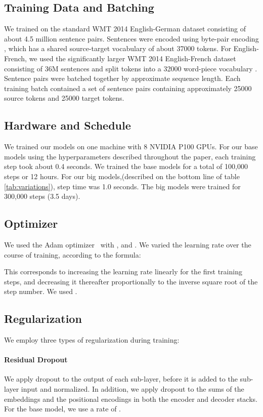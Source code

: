 \documentclass{article}
\begin{document}
\subsection{Training Data and Batching}
We trained on the standard WMT 2014 English-German dataset consisting of about 4.5 million sentence pairs.  Sentences were encoded using byte-pair encoding \citep{DBLP:journals/corr/BritzGLL17}, which has a shared source-target vocabulary of about 37000 tokens. For English-French, we used the significantly larger WMT 2014 English-French dataset consisting of 36M sentences and split tokens into a 32000 word-piece vocabulary \citep{wu2016google}.  Sentence pairs were batched together by approximate sequence length.  Each training batch contained a set of sentence pairs containing approximately 25000 source tokens and 25000 target tokens.  

\subsection{Hardware and Schedule}

We trained our models on one machine with 8 NVIDIA P100 GPUs.  For our base models using the hyperparameters described throughout the paper, each training step took about 0.4 seconds.  We trained the base models for a total of 100,000 steps or 12 hours.  For our big models,(described on the bottom line of table \ref{tab:variations}), step time was 1.0 seconds.  The big models were trained for 300,000 steps (3.5 days).

\subsection{Optimizer} We used the Adam optimizer~\citep{kingma2014adam} with ,  and .  We varied the learning rate over the course of training, according to the formula:



This corresponds to increasing the learning rate linearly for the first  training steps, and decreasing it thereafter proportionally to the inverse square root of the step number.  We used .

\subsection{Regularization} \label{sec:reg}

We employ three types of regularization during training: 
\paragraph{Residual Dropout} We apply dropout \citep{srivastava2014dropout} to the output of each sub-layer, before it is added to the sub-layer input and normalized.   In addition, we apply dropout to the sums of the embeddings and the positional encodings in both the encoder and decoder stacks.  For the base model, we use a rate of .
\end{document}
